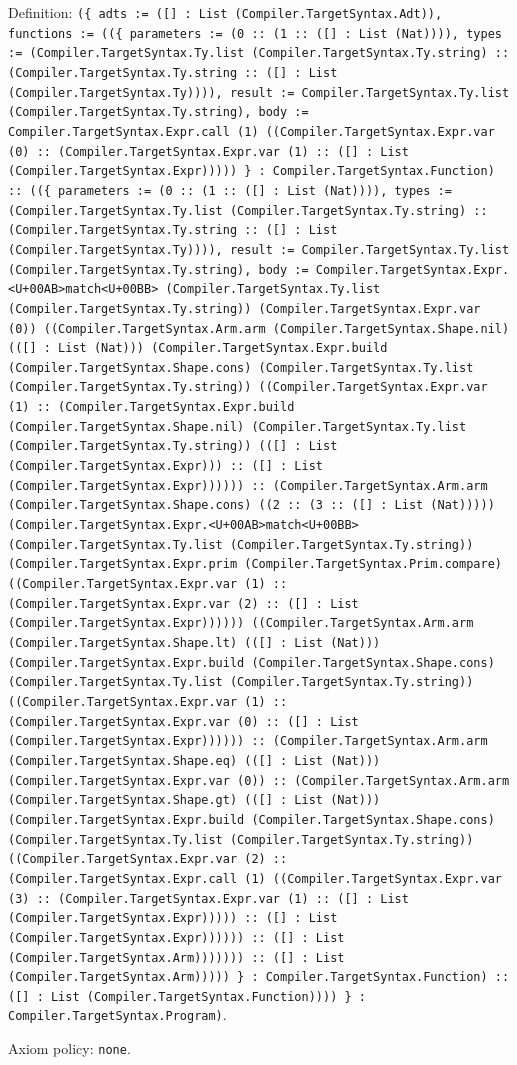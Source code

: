 \documentclass[11pt]{article}
\begin{document}
\noindent Definition: \texttt{(\{ adts := ([] : List (Compiler.TargetSyntax.Adt)), functions := ((\{ parameters := (0 :: (1 :: ([] : List (Nat)))), types := (Compiler.TargetSyntax.Ty.list (Compiler.TargetSyntax.Ty.string) :: (Compiler.TargetSyntax.Ty.string :: ([] : List (Compiler.TargetSyntax.Ty)))), result := Compiler.TargetSyntax.Ty.list (Compiler.TargetSyntax.Ty.string), body := Compiler.TargetSyntax.Expr.call (1) ((Compiler.TargetSyntax.Expr.var (0) :: (Compiler.TargetSyntax.Expr.var (1) :: ([] : List (Compiler.TargetSyntax.Expr))))) \} : Compiler.TargetSyntax.Function) :: ((\{ parameters := (0 :: (1 :: ([] : List (Nat)))), types := (Compiler.TargetSyntax.Ty.list (Compiler.TargetSyntax.Ty.string) :: (Compiler.TargetSyntax.Ty.string :: ([] : List (Compiler.TargetSyntax.Ty)))), result := Compiler.TargetSyntax.Ty.list (Compiler.TargetSyntax.Ty.string), body := Compiler.TargetSyntax.Expr.<U+00AB>match<U+00BB> (Compiler.TargetSyntax.Ty.list (Compiler.TargetSyntax.Ty.string)) (Compiler.TargetSyntax.Expr.var (0)) ((Compiler.TargetSyntax.Arm.arm (Compiler.TargetSyntax.Shape.nil) (([] : List (Nat))) (Compiler.TargetSyntax.Expr.build (Compiler.TargetSyntax.Shape.cons) (Compiler.TargetSyntax.Ty.list (Compiler.TargetSyntax.Ty.string)) ((Compiler.TargetSyntax.Expr.var (1) :: (Compiler.TargetSyntax.Expr.build (Compiler.TargetSyntax.Shape.nil) (Compiler.TargetSyntax.Ty.list (Compiler.TargetSyntax.Ty.string)) (([] : List (Compiler.TargetSyntax.Expr))) :: ([] : List (Compiler.TargetSyntax.Expr)))))) :: (Compiler.TargetSyntax.Arm.arm (Compiler.TargetSyntax.Shape.cons) ((2 :: (3 :: ([] : List (Nat))))) (Compiler.TargetSyntax.Expr.<U+00AB>match<U+00BB> (Compiler.TargetSyntax.Ty.list (Compiler.TargetSyntax.Ty.string)) (Compiler.TargetSyntax.Expr.prim (Compiler.TargetSyntax.Prim.compare) ((Compiler.TargetSyntax.Expr.var (1) :: (Compiler.TargetSyntax.Expr.var (2) :: ([] : List (Compiler.TargetSyntax.Expr)))))) ((Compiler.TargetSyntax.Arm.arm (Compiler.TargetSyntax.Shape.lt) (([] : List (Nat))) (Compiler.TargetSyntax.Expr.build (Compiler.TargetSyntax.Shape.cons) (Compiler.TargetSyntax.Ty.list (Compiler.TargetSyntax.Ty.string)) ((Compiler.TargetSyntax.Expr.var (1) :: (Compiler.TargetSyntax.Expr.var (0) :: ([] : List (Compiler.TargetSyntax.Expr)))))) :: (Compiler.TargetSyntax.Arm.arm (Compiler.TargetSyntax.Shape.eq) (([] : List (Nat))) (Compiler.TargetSyntax.Expr.var (0)) :: (Compiler.TargetSyntax.Arm.arm (Compiler.TargetSyntax.Shape.gt) (([] : List (Nat))) (Compiler.TargetSyntax.Expr.build (Compiler.TargetSyntax.Shape.cons) (Compiler.TargetSyntax.Ty.list (Compiler.TargetSyntax.Ty.string)) ((Compiler.TargetSyntax.Expr.var (2) :: (Compiler.TargetSyntax.Expr.call (1) ((Compiler.TargetSyntax.Expr.var (3) :: (Compiler.TargetSyntax.Expr.var (1) :: ([] : List (Compiler.TargetSyntax.Expr))))) :: ([] : List (Compiler.TargetSyntax.Expr)))))) :: ([] : List (Compiler.TargetSyntax.Arm))))))) :: ([] : List (Compiler.TargetSyntax.Arm))))) \} : Compiler.TargetSyntax.Function) :: ([] : List (Compiler.TargetSyntax.Function)))) \} : Compiler.TargetSyntax.Program)}.\par
\noindent Axiom policy: \texttt{none}.\par
\end{document}
